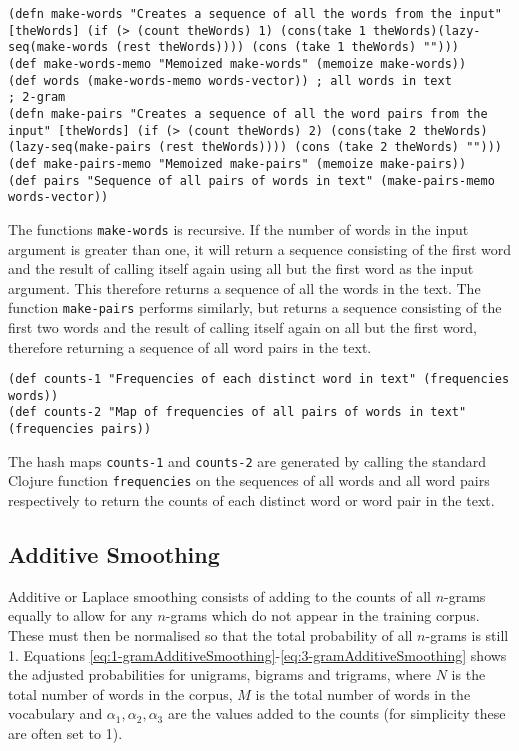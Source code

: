 \begin{lstlisting}
(defn make-words "Creates a sequence of all the words from the input" [theWords] (if (> (count theWords) 1) (cons(take 1 theWords)(lazy-seq(make-words (rest theWords)))) (cons (take 1 theWords) "")))
(def make-words-memo "Memoized make-words" (memoize make-words))
(def words (make-words-memo words-vector)) ; all words in text
; 2-gram
(defn make-pairs "Creates a sequence of all the word pairs from the input" [theWords] (if (> (count theWords) 2) (cons(take 2 theWords)(lazy-seq(make-pairs (rest theWords)))) (cons (take 2 theWords) "")))
(def make-pairs-memo "Memoized make-pairs" (memoize make-pairs))
(def pairs "Sequence of all pairs of words in text" (make-pairs-memo words-vector))
\end{lstlisting}

The functions \lstinline!make-words! is recursive. If the number of words in the input argument is greater than one, it will return a sequence consisting of the first word and the result of calling itself again using all but the first word as the input argument. This therefore returns a sequence of all the words in the text. The function \lstinline!make-pairs! performs similarly, but returns a sequence consisting of the first two words and the result of calling itself again on all but the first word, therefore returning a sequence of all word pairs in the text.

\begin{lstlisting}
(def counts-1 "Frequencies of each distinct word in text" (frequencies words))
(def counts-2 "Map of frequencies of all pairs of words in text" (frequencies pairs))
\end{lstlisting}

The hash maps \lstinline!counts-1! and \lstinline!counts-2! are generated by calling the standard Clojure function \lstinline!frequencies! on the sequences of all words and all word pairs respectively to return the counts of each distinct word or word pair in the text. 

\subsection{Additive Smoothing}

Additive or Laplace smoothing consists of adding to the counts of all $n$-grams equally to allow for any $n$-grams which do not appear in the training corpus. These must then be normalised so that the total probability of all $n$-grams is still 1. Equations \ref{eq:1-gramAdditiveSmoothing}-\ref{eq:3-gramAdditiveSmoothing} shows the adjusted probabilities for unigrams, bigrams and trigrams, where $N$ is the total number of words in the corpus, $M$ is the total number of words in the vocabulary and $\alpha_{1}, \alpha_{2}, \alpha_{3}$ are the values added to the counts (for simplicity these are often set to 1).


